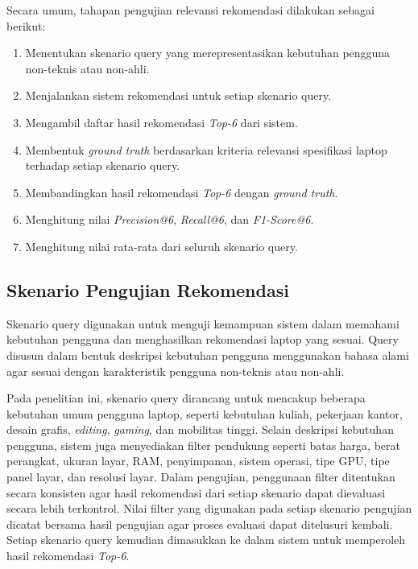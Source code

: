 \noindent Secara umum, tahapan pengujian relevansi rekomendasi dilakukan sebagai berikut:
\begin{enumerate}
\item Menentukan skenario query yang merepresentasikan kebutuhan pengguna non-teknis atau non-ahli.
\item Menjalankan sistem rekomendasi untuk setiap skenario query.
\item Mengambil daftar hasil rekomendasi \textit{Top-6} dari sistem.
\item Membentuk \textit{ground truth} berdasarkan kriteria relevansi spesifikasi laptop terhadap setiap skenario query.
\item Membandingkan hasil rekomendasi \textit{Top-6} dengan \textit{ground truth}.
\item Menghitung nilai \textit{Precision@6}, \textit{Recall@6}, dan \textit{F1-Score@6}.
\item Menghitung nilai rata-rata dari seluruh skenario query.
\end{enumerate}

\subsection{Skenario Pengujian Rekomendasi}
Skenario query digunakan untuk menguji kemampuan sistem dalam memahami kebutuhan pengguna dan menghasilkan rekomendasi laptop yang sesuai. Query disusun dalam bentuk deskripsi kebutuhan pengguna menggunakan bahasa alami agar sesuai dengan karakteristik pengguna non-teknis atau non-ahli.

Pada penelitian ini, skenario query dirancang untuk mencakup beberapa kebutuhan umum pengguna laptop, seperti kebutuhan kuliah, pekerjaan kantor, desain grafis, \textit{editing}, \textit{gaming}, dan mobilitas tinggi. Selain deskripsi kebutuhan pengguna, sistem juga menyediakan filter pendukung seperti batas harga, berat perangkat, ukuran layar, RAM, penyimpanan, sistem operasi, tipe GPU, tipe panel layar, dan resolusi layar. Dalam pengujian, penggunaan filter ditentukan secara konsisten agar hasil rekomendasi dari setiap skenario dapat dievaluasi secara lebih terkontrol. Nilai filter yang digunakan pada setiap skenario pengujian dicatat bersama hasil pengujian agar proses evaluasi dapat ditelusuri kembali. Setiap skenario query kemudian dimasukkan ke dalam sistem untuk memperoleh hasil rekomendasi \textit{Top-6}.

